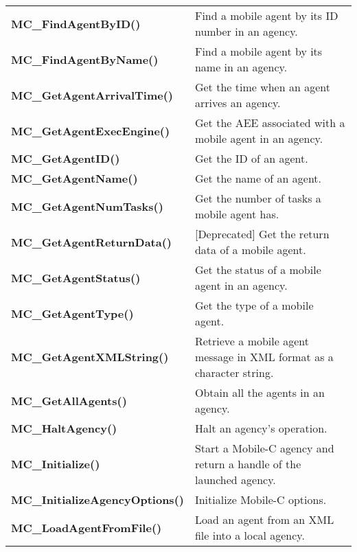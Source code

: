 \begin{table}[!hp]
\begin{center}
\begin{tabular}{p{78 mm}p{77 mm}}
{\bf MC\_FindAgentByID()} \dotfill & Find a mobile agent by its ID number in an agency.\\
{\bf MC\_FindAgentByName()} \dotfill & Find a mobile agent by its name in an agency. \\
{\bf MC\_GetAgentArrivalTime()} \dotfill & Get the time when an agent arrives an agency. \\
{\bf MC\_GetAgentExecEngine()} \dotfill & Get the AEE associated with a mobile agent in an agency. \\
{\bf MC\_GetAgentID()} \dotfill & Get the ID of an agent. \\
{\bf MC\_GetAgentName()} \dotfill & Get the name of an agent. \\
{\bf MC\_GetAgentNumTasks()} \dotfill & Get the number of tasks a mobile agent has. \\
{\bf MC\_GetAgentReturnData()} \dotfill & [Deprecated] Get the return data of a mobile agent. \\
{\bf MC\_GetAgentStatus()} \dotfill & Get the status of a mobile agent in an agency. \\
{\bf MC\_GetAgentType()} \dotfill & Get the type of a mobile agent. \\
{\bf MC\_GetAgentXMLString()} \dotfill & Retrieve a mobile agent message in XML format as a character string. \\
{\bf MC\_GetAllAgents()} \dotfill & Obtain all the agents in an agency. \\
{\bf MC\_HaltAgency()} \dotfill & Halt an agency's operation. \\
{\bf MC\_Initialize()} \dotfill & Start a Mobile-C agency and return a handle of the launched agency. \\
{\bf MC\_InitializeAgencyOptions()} \dotfill & Initialize Mobile-C options. \\
{\bf MC\_LoadAgentFromFile()} \dotfill & Load an agent from an XML file into a local agency.\\
\hline
\end{tabular}
\end{center}
\end{table}
\pagebreak

